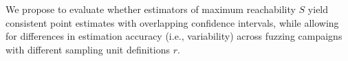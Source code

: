 \documentclass[conference]{IEEEtran}
\newcommand{\result}[1]{%
\begin{tcolorbox}[colframe=black,boxrule=0.5pt,arc=4pt,
      left=6pt,right=6pt,top=6pt,bottom=6pt,boxsep=0pt,width=\columnwidth]%
      {\emph{#1}}
\end{tcolorbox}%
}
\begin{document}
We propose to evaluate whether estimators of maximum reachability $S$ yield
consistent point estimates with overlapping confidence intervals, while allowing
for differences in estimation accuracy (i.e., variability) across fuzzing
campaigns with different sampling unit definitions $r$.


% 

% 
% 
% 
\end{document}
